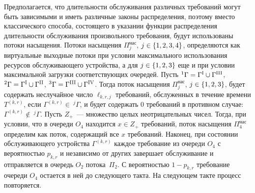 \documentclass[a4paper,12pt,russian]{extarticle}
\newcommand{\G}{\Gamma}
\newcommand{\ga}[1]{\Gamma^{\left( #1 \right)} }
\newcommand{\Tt}[1]{T^{\left( #1 \right)} }
\begin{document}
Предполагается, что длительности обслуживания различных требований могут быть зависимыми и иметь различные законы распределения, поэтому вместо классического способа, состоящего в указании функции распределения длительности обслуживания произвольного требования, будут использованы потоки насыщения. Потоки насыщения $\Pi^{\mathrm{\text{нас}}}_j$, $j \in \left\{1,2,3,4\right\}$, определяются как виртуальные выходные потоки при 
условии максимального использования ресурсов обслуживающего устройства, а для $j\in \left\{1, 2, 3\right\}$ еще и при условии максимальной загрузки соответствующих очередей. Пусть ${}^1\G=\G^{\mathrm{\Rmnum{1}}} \cup \G^{\mathrm{\Rmnum{3}}}$, 
${}^2\G=\G^{\mathrm{\Rmnum{1}}} \cup \G^{\mathrm{\Rmnum{2}}}$,
${}^3\G=\G^{\mathrm{\Rmnum{3}}} \cup \G^{\mathrm{\Rmnum{4}}}$. 
Тогда поток насыщения $\Pi^{\mathrm{\text{нас}}}_j$, $j\in \left\{1,2,3\right\}$, будет содержать неслучайное число $\ell_{k,r,j}$ требований, обслуженных в течение времени $\Tt{k,r}$, если $\ga{k,r} \in~^j\G$, и будет содержать $0$ требований в противном случае: $\ga{k,r} \notin ~^j\G$. Пусть $Z_+$~--- множество целых неотрицательных чисел. Тогда, при условии, что в очереди $O_4$ находится $x \in Z_+$ требований, поток насыщения $\Pi^{\mathrm{\text{нас}}}_4$ определим как поток, содержащий все $x$ требований.
Наконец, при состоянии обслуживающего устройства $\ga{k,r}$ каждое требование из очереди $O_4$ с вероятностью $p_{k,r}$ и независимо от других завершает обслуживание и отправляется в очередь $O_2$ потока~$\Pi_2$. С вероятностью $1-p_{k,r}$ требование очереди $O_4$ остается в ней до следующего такта. На следующем такте процесс повторяется.
\end{document}
